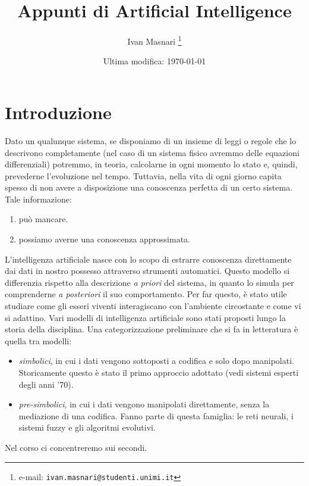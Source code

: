 \documentclass[10pt,a4paper]{article}
\begin{document}
\title{Appunti di Artificial Intelligence}

\author{Ivan Masnari%
  \thanks{e-mail: \texttt{ivan.masnari@studenti.unimi.it}}}

\date{Ultima modifica: \today}
\maketitle
\section{Introduzione}

Dato un qualunque sistema, se disponiamo di un insieme di leggi o regole che lo descrivono completamente (nel caso di un sistema fisico avremmo delle equazioni differenziali) potremmo, in teoria, calcolarne in ogni momento lo stato e, quindi, prevederne l'evoluzione nel tempo. 
Tuttavia, nella vita di ogni giorno capita spesso di non avere a disposizione una conoscenza perfetta di un certo sistema. Tale informazione:
\begin{enumerate}
\item{può mancare.}
\item{possiamo averne una conoscenza approssimata.}
\end{enumerate}
L'intelligenza artificiale nasce con lo scopo di estrarre conoscenza direttamente dai dati in nostro possesso attraverso strumenti automatici. Questo modello si differenzia rispetto alla descrizione \emph{a priori} del sistema, in quanto lo simula per comprenderne \emph{a posteriori} il suo comportamento. Per far questo, è stato utile studiare come gli esseri viventi interagiscano con l'ambiente circostante e come vi si adattino.
Vari modelli di intelligenza artificiale sono stati proposti lungo la storia della disciplina. Una categorizzazione preliminare che si fa in letteratura è quella tra modelli:
\begin{itemize}
\item{\emph{simbolici}, in cui i dati vengono sottoposti a codifica e solo dopo manipolati. Storicamente questo è stato il primo approccio adottato (vedi sistemi esperti degli anni '70).}
\item{\emph{pre-simbolici}, in cui i dati vengono manipolati direttamente, senza la mediazione di una codifica. Fanno parte di questa famiglia: le reti neurali, i sistemi fuzzy e gli algoritmi evolutivi.}
\end{itemize}
Nel corso ci concentreremo sui secondi.
\end{document}
